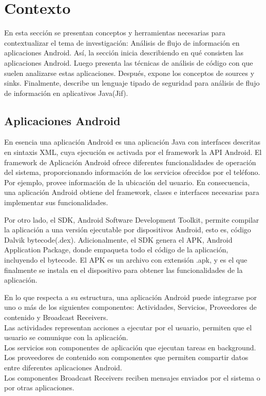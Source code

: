 \section{Contexto}
\label{sec:context}
En esta sección se presentan conceptos y herramientas necesarias para
contextualizar el tema de investigación: Análisis de flujo de información en
aplicaciones Android.
Así, la sección inicia describiendo en qué consisten las aplicaciones Android. Luego presenta
las técnicas de análisis de código con que suelen analizarse estas aplicaciones.
Después, expone los conceptos de sources y sinks. Finalmente, describe un
lenguaje tipado de seguridad para análisis de flujo de información en
aplicativos Java(Jif).
\subsection{Aplicaciones Android}
En esencia una aplicación Android es una aplicación Java con interfaces
descritas en sintaxis XML, cuya ejecución es activada por el framework la API
Android.\newline 
El framework de Aplicación Android ofrece diferentes funcionalidades de
operación del sistema, proporcionando información de los servicios ofrecidos por
el teléfono. Por ejemplo, provee información de la ubicación del
usuario.\newline 
En consecuencia, una aplicación Android obtiene del framework, clases e
interfaces necesarias para implementar sus funcionalidades.

Por otro lado, el SDK, Android Software Development Toolkit, permite compilar
la aplicación a una versión ejecutable por dispositivos Android, esto es, código
Dalvik bytecode(.dex). Adicionalmente, el SDK genera el APK, Android Application
Package, donde empaqueta todo el código de la aplicación, incluyendo el
bytecode. El APK es un archivo con extensión .apk, y es el que finalmente se
instala en el dispositivo para obtener las funcionalidades de la aplicación.

En lo que respecta a su estructura, 
una aplicación Android puede integrarse por uno o más de los siguientes
componentes: Actividades, Servicios, Proveedores de contenido y Broadcast
Receivers.\\
Las actividades representan acciones a ejecutar por el usuario, permiten que el
usuario se comunique con la aplicación.\\
Los servicios son componentes de aplicación que ejecutan tareas en background.\\
Los proveedores de contenido son componentes que permiten compartir datos entre
diferentes aplicaciones Android.\\
Los componentes Broadcast Receivers reciben mensajes enviados por el sistema o
por otras aplicaciones.

